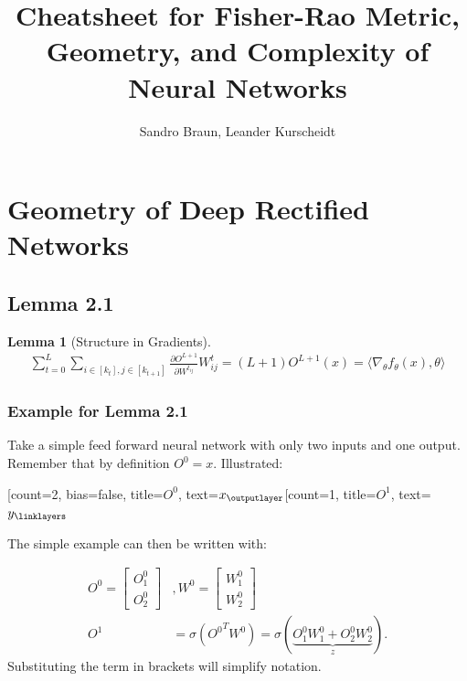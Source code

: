 \documentclass[a4paper]{article}
\title{Cheatsheet for Fisher-Rao Metric, Geometry, and Complexity of Neural Networks}
\author{Sandro Braun, Leander Kurscheidt}
\newtheorem{lemma}[theorem]{Lemma}
\begin{document}
\maketitle
\begin{abstract}
\end{abstract}
\section{Geometry of Deep Rectified Networks}


\subsection{Lemma 2.1}

\begin{lemma}[Structure in Gradients]
	\begin{align}
		\label{lemma_structure_in_gradient}
		\sum_{t=0}^{L} \sum_{i \in [k_t], j \in [k_{t+1}]} \frac{\partial O^{L+1}}{\partial W^{t_{ij}}} W^t_{ij} = (L+1)O^{L+1}(x) = \langle \nabla_\theta f_\theta (x), \theta \rangle
	\end{align}
\end{lemma}

\subsubsection{Example for Lemma 2.1}

Take a simple feed forward neural network with only two inputs and one output. Remember that by definition $O^0 = x$.
Illustrated: \\
\begin{neuralnetwork}[height=2]
	\newcommand{\nodetextx}[2]{$x_#2$}
	\newcommand{\nodetexty}[2]{$y_#2$}
	[count=2, bias=false, title=$O^0$, text=\nodetextx]
	\outputlayer[count=1, title=$O^1$, text=\nodetexty] \linklayers
\end{neuralnetwork}

The simple example can then be written with:

\begin{align}
	\label{eq_simple_nn}
	O^0 = 	\begin{bmatrix}
				O^0_1 \\ 
				O^0_2
			\end{bmatrix} &,
	W^0 = 	\begin{bmatrix}
				W^0_1 \\
				W^0_2
			\end{bmatrix} \\
			O^1 &= \sigma({O^0}^T W^0) = \sigma(
											\underbrace{O^0_1 W^0_1 + O^0_2 W^0_2}_z
											).
\end{align}
Substituting the term in brackets will simplify notation.
\end{document}
